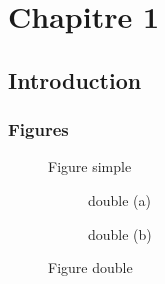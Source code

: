 
\lhead[\fancyplain{}{\leftmark}]%
      {\fancyplain{}{}} %
\chead[\fancyplain{}{}]%
      {\fancyplain{}{}}
\rhead[\fancyplain{}{}]%
      {\fancyplain{}{\rightmark}}%
\lfoot[\fancyplain{}{}]%
      {\fancyplain{}{}}
\cfoot[\fancyplain{}{\thepage}]%
      {\fancyplain{}{\thepage}} %
\rfoot[\fancyplain{}{}]%
      {\fancyplain{}{\scriptsize}}



\chapter{Chapitre 1}
\label{ch:1}

\minitoc
\newpage

\section{Introduction}
\label{sec:intro1}

\subsection{Figures}

\begin{figure}
	\centering
	\def\svgwidth{0.5\columnwidth}
	\fontsize{10pt}{10pt}\selectfont
	\caption{Figure simple}\label{fig:figure_simple}
\end{figure}

\begin{figure}
	\centering
	\begin{subfigure}[b]{0.45\textwidth}
		\centering
		\def\svgwidth{\columnwidth}
		\fontsize{10pt}{10pt}\selectfont
		\caption{double (a)}\label{fig:double_a}
	\end{subfigure}
	\qquad
	\begin{subfigure}[b]{0.45\textwidth}
		\centering
		\def\svgwidth{\columnwidth}
		\fontsize{10pt}{10pt}\selectfont
		\caption{double (b)}\label{fig:double_b}
	\end{subfigure}
	\caption{Figure double}\label{fig:double_figure}
\end{figure}


